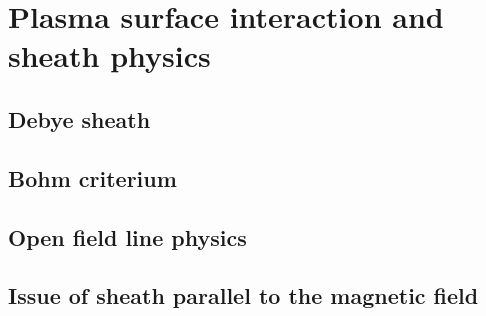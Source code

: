 	\section{Plasma surface interaction and sheath physics}
		\subsection{Debye sheath}
		\subsection{Bohm criterium}
		\subsection{Open field line physics}
		\subsection{Issue of sheath parallel to the magnetic field}

		